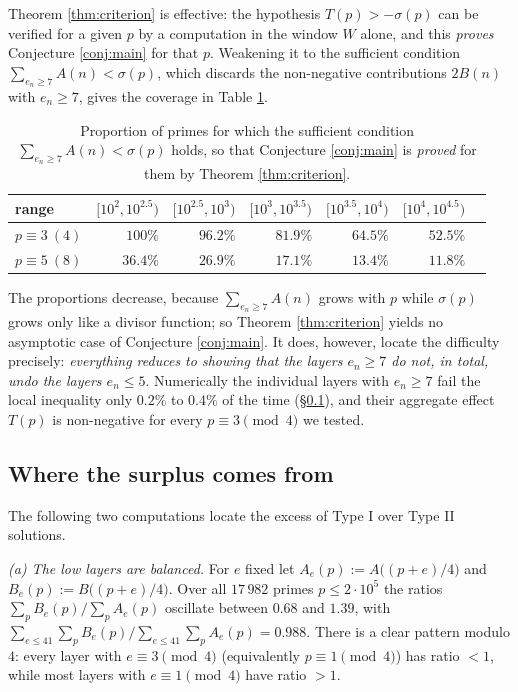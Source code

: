 \documentclass[11pt,reqno]{amsart}
\theoremstyle{plain}
\theoremstyle{definition}
\numberwithin{equation}{section}
\begin{document}
Theorem \ref{thm:criterion} is effective: the hypothesis $T(p)>-\sigma(p)$ can be
verified for a given $p$ by a computation in the window $W$ alone, and this
\emph{proves} Conjecture \ref{conj:main} for that $p$. Weakening it to the sufficient
condition $\sum_{e_{n}\ge7}A(n)<\sigma(p)$, which discards the non-negative
contributions $2B(n)$ with $e_{n}\ge7$, gives the coverage in Table \ref{tab:coverage}.

\begin{table}[ht]
\caption{Proportion of primes for which the sufficient condition
$\sum_{e_{n}\ge7}A(n)<\sigma(p)$ holds, so that Conjecture \ref{conj:main} is
\emph{proved} for them by Theorem \ref{thm:criterion}.}\label{tab:coverage}
\begin{tabular}{lrrrrrr}
\toprule
range & $[10^{2},10^{2.5})$ & $[10^{2.5},10^{3})$ & $[10^{3},10^{3.5})$ &
$[10^{3.5},10^{4})$ & $[10^{4},10^{4.5})$\\
\midrule
$p\equiv3\ (4)$ & $100\%$ & $96.2\%$ & $81.9\%$ & $64.5\%$ & $52.5\%$\\
$p\equiv5\ (8)$ & $36.4\%$ & $26.9\%$ & $17.1\%$ & $13.4\%$ & $11.8\%$\\
\bottomrule
\end{tabular}
\end{table}

The proportions decrease, because $\sum_{e_{n}\ge7}A(n)$ grows with $p$ while
$\sigma(p)$ grows only like a divisor function; so Theorem \ref{thm:criterion} yields
no asymptotic case of Conjecture \ref{conj:main}. It does, however, locate the
difficulty precisely: \emph{everything reduces to showing that the layers $e_{n}\ge7$
do not, in total, undo the layers $e_{n}\le5$}. Numerically the individual layers with
$e_{n}\ge7$ fail the local inequality only $0.2\%$ to $0.4\%$ of the time
(\S\ref{sec:diagnosis}), and their aggregate effect $T(p)$ is non-negative for every
$p\equiv3\pmod4$ we tested.

\subsection{Where the surplus comes from}\label{sec:diagnosis}

The following two computations locate the excess of Type I over Type II solutions.

\emph{(a) The low layers are balanced.} For $e$ fixed let
$A_{e}(p):=A\bigl((p+e)/4\bigr)$ and $B_{e}(p):=B\bigl((p+e)/4\bigr)$. Over all
$17\,982$ primes $p\le2\cdot10^{5}$ the ratios
$\sum_{p}B_{e}(p)\big/\sum_{p}A_{e}(p)$ oscillate between $0.68$ and $1.39$, with
$\sum_{e\le41}\sum_{p}B_{e}(p)\big/\sum_{e\le41}\sum_{p}A_{e}(p)=0.988$. There is a
clear pattern modulo $4$: every layer with $e\equiv3\pmod4$ (equivalently
$p\equiv1\pmod4$) has ratio $<1$, while most layers with $e\equiv1\pmod4$ have ratio
$>1$.
\end{document}

